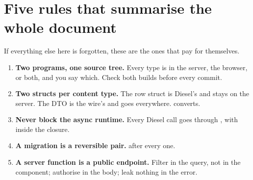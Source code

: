 \section{Five rules that summarise the whole document}

If everything else here is forgotten, these are the ones that pay for themselves.

\begin{enumerate}
  \item \textbf{Two programs, one source tree.} Every type is in the server, the browser, or both,
    and you say which. Check both builds before every commit.
  \item \textbf{Two structs per content type.} The row struct is Diesel's and stays on the server.
    The DTO is the wire's and goes everywhere.  converts.
  \item \textbf{Never block the async runtime.} Every Diesel call goes through
    , with  inside the closure.
  \item \textbf{A migration is a reversible pair.}  after every one.
  \item \textbf{A server function is a public endpoint.} Filter in the query, not in the component;
    authorise in the body; leak nothing in the error.
\end{enumerate}
